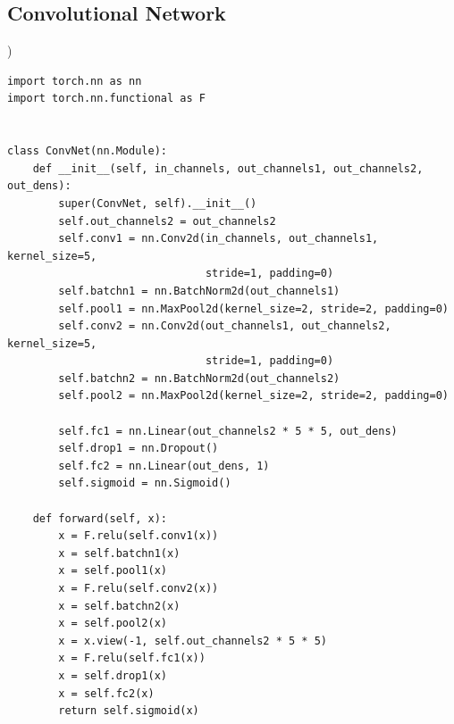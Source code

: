 \documentclass[aps,prb,10pt,twocolumn,groupedaddress]{revtex4-1}
\begin{document}
\subsection{Convolutional Network})
\begin{lstlisting}
import torch.nn as nn
import torch.nn.functional as F


class ConvNet(nn.Module):
	def __init__(self, in_channels, out_channels1, out_channels2, out_dens):
		super(ConvNet, self).__init__()
		self.out_channels2 = out_channels2
		self.conv1 = nn.Conv2d(in_channels, out_channels1, kernel_size=5,
		                       stride=1, padding=0)
		self.batchn1 = nn.BatchNorm2d(out_channels1)
		self.pool1 = nn.MaxPool2d(kernel_size=2, stride=2, padding=0)
		self.conv2 = nn.Conv2d(out_channels1, out_channels2, kernel_size=5,
		                       stride=1, padding=0)
		self.batchn2 = nn.BatchNorm2d(out_channels2)
		self.pool2 = nn.MaxPool2d(kernel_size=2, stride=2, padding=0)

		self.fc1 = nn.Linear(out_channels2 * 5 * 5, out_dens)
		self.drop1 = nn.Dropout()
		self.fc2 = nn.Linear(out_dens, 1)
		self.sigmoid = nn.Sigmoid()

	def forward(self, x):
		x = F.relu(self.conv1(x))
		x = self.batchn1(x)
		x = self.pool1(x)
		x = F.relu(self.conv2(x))
		x = self.batchn2(x)
		x = self.pool2(x)
		x = x.view(-1, self.out_channels2 * 5 * 5)
		x = F.relu(self.fc1(x))
		x = self.drop1(x)
		x = self.fc2(x)
		return self.sigmoid(x)
\end{lstlisting}
\end{document}
